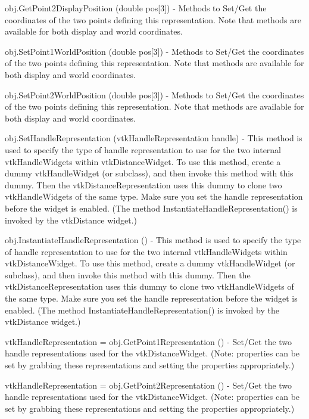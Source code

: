 \begin{DoxyItemize}
\item {\ttfamily obj.\-Get\-Point2\-Display\-Position (double pos\mbox{[}3\mbox{]})} -\/ Methods to Set/\-Get the coordinates of the two points defining this representation. Note that methods are available for both display and world coordinates.  
\item {\ttfamily obj.\-Set\-Point1\-World\-Position (double pos\mbox{[}3\mbox{]})} -\/ Methods to Set/\-Get the coordinates of the two points defining this representation. Note that methods are available for both display and world coordinates.  
\item {\ttfamily obj.\-Set\-Point2\-World\-Position (double pos\mbox{[}3\mbox{]})} -\/ Methods to Set/\-Get the coordinates of the two points defining this representation. Note that methods are available for both display and world coordinates.  
\item {\ttfamily obj.\-Set\-Handle\-Representation (vtk\-Handle\-Representation handle)} -\/ This method is used to specify the type of handle representation to use for the two internal vtk\-Handle\-Widgets within vtk\-Distance\-Widget. To use this method, create a dummy vtk\-Handle\-Widget (or subclass), and then invoke this method with this dummy. Then the vtk\-Distance\-Representation uses this dummy to clone two vtk\-Handle\-Widgets of the same type. Make sure you set the handle representation before the widget is enabled. (The method Instantiate\-Handle\-Representation() is invoked by the vtk\-Distance widget.)  
\item {\ttfamily obj.\-Instantiate\-Handle\-Representation ()} -\/ This method is used to specify the type of handle representation to use for the two internal vtk\-Handle\-Widgets within vtk\-Distance\-Widget. To use this method, create a dummy vtk\-Handle\-Widget (or subclass), and then invoke this method with this dummy. Then the vtk\-Distance\-Representation uses this dummy to clone two vtk\-Handle\-Widgets of the same type. Make sure you set the handle representation before the widget is enabled. (The method Instantiate\-Handle\-Representation() is invoked by the vtk\-Distance widget.)  
\item {\ttfamily vtk\-Handle\-Representation = obj.\-Get\-Point1\-Representation ()} -\/ Set/\-Get the two handle representations used for the vtk\-Distance\-Widget. (Note\-: properties can be set by grabbing these representations and setting the properties appropriately.)  
\item {\ttfamily vtk\-Handle\-Representation = obj.\-Get\-Point2\-Representation ()} -\/ Set/\-Get the two handle representations used for the vtk\-Distance\-Widget. (Note\-: properties can be set by grabbing these representations and setting the properties appropriately.)  

\end{DoxyItemize}
